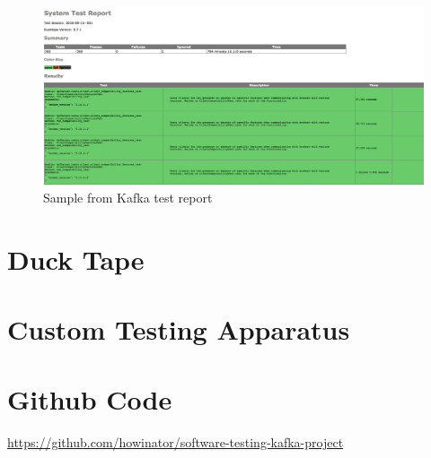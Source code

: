 \begin{figure}
    \centering
    \includegraphics[width=1.0\textwidth]{kafkatestreport.png}
    \caption{Sample from Kafka test report}
    \label{fig:kafkareport}
\end{figure}




\section{Duck Tape}

\section{Custom Testing Apparatus}



\newpage







\appendix

\section{Github Code}

\href{https://github.com/howinator/software-testing-kafka-project}{https://github.com/howinator/software-testing-kafka-project}

%

